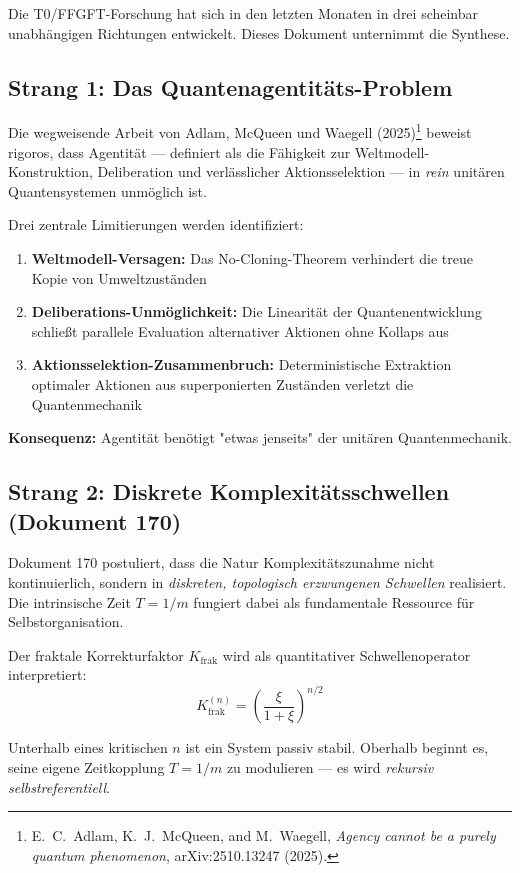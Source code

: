 \documentclass[11pt,a4paper]{article}
\begin{document}
	Die T0/FFGFT-Forschung hat sich in den letzten Monaten in drei scheinbar unabhängigen Richtungen entwickelt. Dieses Dokument unternimmt die Synthese.
	
	\subsection{Strang 1: Das Quantenagentitäts-Problem}
	
	Die wegweisende Arbeit von Adlam, McQueen und Waegell (2025)\footnote{E.~C.~Adlam, K.~J.~McQueen, and M.~Waegell, \emph{Agency cannot be a purely quantum phenomenon}, arXiv:2510.13247 (2025).} beweist rigoros, dass Agentität — definiert als die Fähigkeit zur Weltmodell-Konstruktion, Deliberation und verlässlicher Aktionsselektion — in \emph{rein} unitären Quantensystemen unmöglich ist.
	
	Drei zentrale Limitierungen werden identifiziert:
	\begin{enumerate}
		\item \textbf{Weltmodell-Versagen:} Das No-Cloning-Theorem verhindert die treue Kopie von Umweltzuständen
		\item \textbf{Deliberations-Unmöglichkeit:} Die Linearität der Quantenentwicklung schließt parallele Evaluation alternativer Aktionen ohne Kollaps aus
		\item \textbf{Aktionsselektion-Zusammenbruch:} Deterministische Extraktion optimaler Aktionen aus superponierten Zuständen verletzt die Quantenmechanik
	\end{enumerate}
	
	\textbf{Konsequenz:} Agentität benötigt "etwas jenseits" der unitären Quantenmechanik.
	
	\subsection{Strang 2: Diskrete Komplexitätsschwellen (Dokument 170)}
	
	Dokument 170 postuliert, dass die Natur Komplexitätszunahme nicht kontinuierlich, sondern in \emph{diskreten, topologisch erzwungenen Schwellen} realisiert. Die intrinsische Zeit \(T = 1/m\) fungiert dabei als fundamentale Ressource für Selbstorganisation.
	
	Der fraktale Korrekturfaktor \(K_{\text{frak}}\) wird als quantitativer Schwellenoperator interpretiert:
	\[
	K_{\text{frak}}^{(n)} = \left(\frac{\xi}{1+\xi}\right)^{n/2}
	\]
	
	Unterhalb eines kritischen \(n\) ist ein System passiv stabil. Oberhalb beginnt es, seine eigene Zeitkopplung \(T = 1/m\) zu modulieren — es wird \emph{rekursiv selbstreferentiell}.
	
\end{document}
